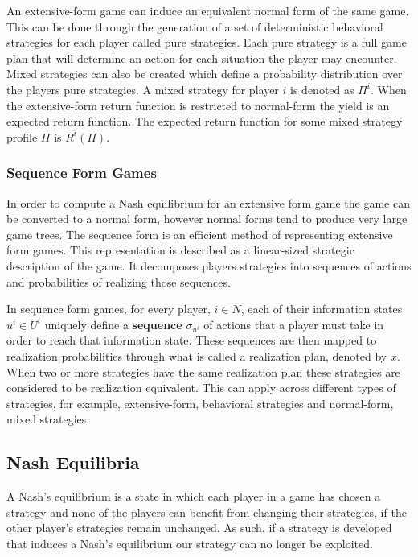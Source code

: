 An extensive-form game can induce an equivalent normal form of the same game.
This can be done through the generation of a set of deterministic behavioral strategies for each player
called pure strategies.
Each pure strategy is a full game plan that will determine an action for each situation the player may encounter.
Mixed strategies can also be created which define a probability distribution over the players pure strategies.
A mixed strategy for player $i$ is denoted as $\Pi^i$.
When the extensive-form return function is restricted to normal-form the yield is an expected return function.
The expected return function for some mixed strategy profile $\Pi$ is $R^i(\Pi)$\citep{heinrich2017reinforcement}.

\subsubsection{Sequence Form Games}
In order to compute a Nash equilibrium for an extensive form game the game can be converted to a normal form,
however normal forms tend to produce very large game trees.
The sequence form is an efficient method of representing extensive form games\citep{koller1996efficient}.
This representation is described as a linear-sized strategic description of the game.
It decomposes players strategies into sequences of actions and probabilities of realizing those sequences.

In sequence form games, for every player, $i\in N$, each of their information states $u^i\in U^i$
uniquely define a \textbf{sequence} $\sigma_{u^i}$ of actions that a player must take in order to reach
that information state.
These sequences are then mapped to realization probabilities through what is called a realization plan,
denoted by $x$.
When two or more strategies have the same realization plan these strategies are considered to be
realization equivalent\citep{von1996efficient}.
This can apply across different types of strategies, for example, extensive-form, behavioral strategies
and normal-form, mixed strategies\citep{kuhn2016extensive}.

\subsection{Nash Equilibria}\label{subsec:nashEquilibria}
A Nash's equilibrium is a state in which each player in a game has chosen a strategy and
none of the players can benefit from changing their strategies, if the other player's strategies remain unchanged.
As such, if a strategy is developed that induces a Nash's equilibrium our strategy can no longer be exploited.

